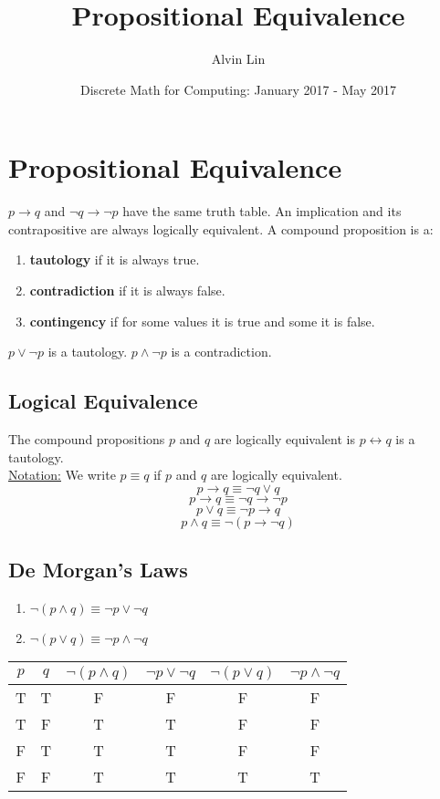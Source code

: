 \documentclass{math}
\title{Propositional Equivalence}
\author{Alvin Lin}
\date{Discrete Math for Computing: January 2017 - May 2017}
\begin{document}
\maketitle

\section*{Propositional Equivalence}
\( p \to q \)  and \( \neg{q} \to \neg{p} \) have the same truth table. An
implication and its contrapositive are always logically equivalent.
A compound proposition is a:
\begin{enumerate}
  \item \textbf{tautology} if it is always true.
  \item \textbf{contradiction} if it is always false.
  \item \textbf{contingency} if for some values it is true and some it is false.
\end{enumerate}
\( p \vee \neg{p} \) is a tautology. \( p \wedge \neg{p} \) is a contradiction.

\subsection*{Logical Equivalence}
The compound propositions \( p \) and \( q \) are logically equivalent is
\( p \leftrightarrow q \) is a tautology. \\
\underline{Notation:} We write \( p \equiv q \) if \( p \) and \( q \) are
logically equivalent.
\[ p \to q \equiv \neg{q} \vee q \]
\[ p \to q \equiv \neg{q} \to \neg{p} \]
\[ p \vee q \equiv \neg{p} \to q \]
\[ p \wedge q \equiv \neg{(p \to \neg{q})} \]

\subsection*{De Morgan's Laws}
\begin{enumerate}
  \item \( \neg{(p \wedge q)} \equiv \neg{p} \vee \neg{q} \)
  \item \( \neg{(p \vee q)} \equiv \neg{p} \wedge \neg{q} \)
\end{enumerate}
\begin{center}
  \begin{tabular}{|c|c|c|c|c|c|}
    \hline
    \( p \) & \( q \) & \( \neg{(p \wedge q)} \) & \( \neg{p} \vee \neg{q} \) &
    \( \neg{(p \vee q)} \) & \( \neg{p} \wedge \neg{q} \) \\ \hline
    T & T & F & F & F & F \\ \hline
    T & F & T & T & F & F \\ \hline
    F & T & T & T & F & F \\ \hline
    F & F & T & T & T & T \\ \hline
  \end{tabular}
\end{center}
\end{document}
